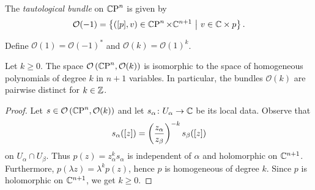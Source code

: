 
\begin{definicija}
The \emph{tautological bundle} on
$\mathbb{C}\!\operatorname{P}^{n}$ is given by
\[
\mathcal{O}(-1) =
\left\{\left([p], v\right) \in \mathbb{C}\!\operatorname{P}^{n} \times \mathbb{C}^{n+1}~\middle\vert~v \in \mathbb{C} \times p\right\}.
\]
\end{definicija}


\begin{definicija}
Define $\mathcal{O}(1) = \mathcal{O}(-1)^*$ and
$\mathcal{O}(k) = \mathcal{O}(1)^k$.
\end{definicija}


\begin{trditev}
Let $k \geq 0$. The space
$\mathcal{O} \left(\mathbb{C}\!\operatorname{P}^{n}, \mathcal{O}(k)\right)$ is isomorphic to
the space of homogeneous polynomials of degree $k$ in $n+1$
variables. In particular, the bundles $\mathcal{O}(k)$ are pairwise
distinct for $k \in \mathbb{Z}$.
\end{trditev}

\begin{proof}
Let $s \in \mathcal{O} \left(\mathbb{C}\!\operatorname{P}^{n}, \mathcal{O}(k)\right)$ and let
$s_\alpha \colon U_\alpha \to \mathbb{C}$ be its local data. Observe that
\[
s_\alpha([z]) = \left(\frac{z_\alpha}{z_\beta}\right)^{-k} s_\beta([z])
\]
on $U_\alpha \cap U_\beta$. Thus
$p(z) = z_\alpha^k s_\alpha$ is independent of $\alpha$ and
holomorphic on $\mathbb{C}^{n+1}$. Furthermore,
$p(\lambda z) = \lambda^k p(z)$, hence $p$ is homogeneous of degree
$k$. Since $p$ is holomorphic on $\mathbb{C}^{n+1}$, we get $k \geq 0$.

\end{proof}
